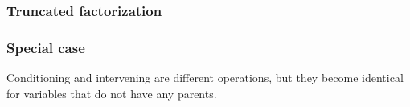 \documentclass{beamer}
\begin{document}
\begin{frame}
    \frametitle{Truncated factorization}
\end{frame}

\begin{frame}
    \frametitle{Special case}
    \begin{flushleft}
        Conditioning and intervening are different operations, but they become identical for variables that do not have 
        any parents.
    \end{flushleft}
\end{frame}
\end{document}
